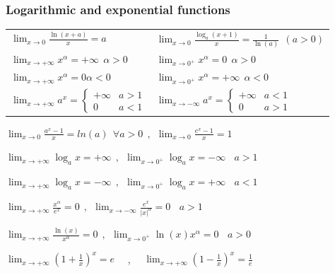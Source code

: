 \subsubsection{Logarithmic and exponential functions}
\begin{tabularx}{\textwidth}{ X X }
$ \displaystyle \lim_{x\rightarrow0}\frac{\ln(x+a)}{x}=a $ &
$ \displaystyle \lim_{x\rightarrow0}\frac{\log_a(x+1)}{x}=\frac{1}{\ln(a)} ~~ (a>0) $ \\ [1.7ex]

$ \displaystyle \lim_{x\rightarrow+\infty}x^\alpha=+\infty ~~ \alpha>0 $ &
$ \displaystyle \lim_{x\rightarrow0^+}x^\alpha=0 ~~ \alpha>0 $ \\ [1.7ex]

$ \displaystyle \lim_{x\rightarrow+\infty}x^\alpha=0 \alpha<0 $ & 
$ \displaystyle \lim_{x\rightarrow0^+}x^\alpha=+\infty ~~ \alpha<0 $ \\ [1.7ex]

$ \displaystyle \lim_{x\rightarrow+\infty}a^x= \begin{cases}
+\infty & a>1 \\
0 & a<1
\end{cases} $ & 
$ \displaystyle \lim_{x\rightarrow-\infty}a^x= \begin{cases}
+\infty & a<1 \\
0 & a>1
\end{cases} $ \\ [1.7ex]

\end{tabularx}



$ \displaystyle
\lim_{x\rightarrow0}\frac{a^x-1}{x}=ln(a) ~~ \forall a>0 ~~,~~ \lim_{x\rightarrow0}\frac{e^x-1}{x}=1
$

$ \displaystyle
\lim_{x\rightarrow+\infty}\log_ax=+\infty ~~,~~ \lim_{x\rightarrow0^+}\log_ax=-\infty ~~~~ a>1
$

$ \displaystyle
\lim_{x\rightarrow+\infty}\log_ax=-\infty ~~,~~ \lim_{x\rightarrow0^+}\log_ax=+\infty ~~~~ a<1
$

$ \displaystyle
\lim_{x\rightarrow+\infty}\frac{x^\alpha}{e^x}=0 ~~,~~ \lim_{x\rightarrow-\infty}\frac{e^x}{\left|x\right|^\alpha}=0 ~~~~ a>1
$

$ \displaystyle
\lim_{x\rightarrow+\infty}\frac{\ln(x)}{x^\alpha}=0 ~~,~~ \lim_{x\rightarrow 0^+}\ln(x)x^\alpha=0 ~~~~ a>0
$


$ \displaystyle \lim_{x\rightarrow+\infty}\left(1+\frac{1}{x}\right)^x=e $ \ \ , \ \ 
$ \displaystyle \lim_{x\rightarrow+\infty}\left(1-\frac{1}{x}\right)^x=\frac{1}{e} $


